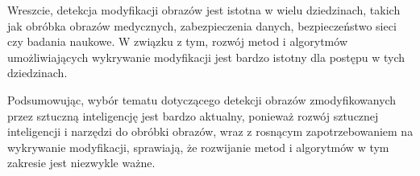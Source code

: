 Wreszcie, detekcja modyfikacji obrazów jest istotna w wielu dziedzinach, takich jak obróbka obrazów medycznych, zabezpieczenia danych, bezpieczeństwo sieci czy badania naukowe.
W związku z tym, rozwój metod i algorytmów umożliwiających wykrywanie modyfikacji jest bardzo istotny dla postępu w tych dziedzinach.


Podsumowując, wybór tematu dotyczącego detekcji obrazów zmodyfikowanych przez sztuczną inteligencję jest bardzo aktualny, ponieważ rozwój sztucznej inteligencji i narzędzi do obróbki obrazów, wraz z rosnącym zapotrzebowaniem na wykrywanie modyfikacji, sprawiają, że rozwijanie metod i algorytmów w tym zakresie jest niezwykle ważne.